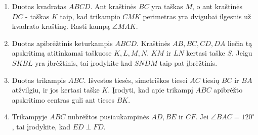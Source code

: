 \begin{enumerate}
\item Duotas kvadratas $ABCD$. Ant kraštinės $BC$ yra taškas
  $M$, o ant kraštinės $DC$ - taškas $K$ taip, kad trikampio
  $CMK$ perimetras yra dvigubai ilgesnis už kvadrato
  kraštinę. Rasti kampą $\angle MAK$.
\item Duotas apibrėžtinis keturkampis $ABCD$. Kraštinės $AB,
  BC, CD, DA$ liečia tą apskritimą atitinkamai taškuose $K,
  L, M, N$. $KM$ ir $LN$ kertasi taške $S$. Jeigu $SKBL$ yra
  įbrėžtinis, tai įrodykite kad $SNDM$ taip pat įbrėžtinis.
\item Duotas trikampis $ABC$. Išvestos tiesės, simetriškos
  tiesei $AC$ tiesių $BC$ ir $BA$ atžvilgiu, ir jos kertasi
  taške $K$. Įrodyti, kad apie trikampį $ABC$ apibrėžto
  apskritimo centras guli ant tieses $BK$.
\item Trikampyje $ABC$ nubrėžtos pusiaukampinės $AD, BE$ ir
  $CF$. Jei $\angle BAC=120^\circ$, tai įrodykite, kad
  $ED\perp FD$.

\end{enumerate}

